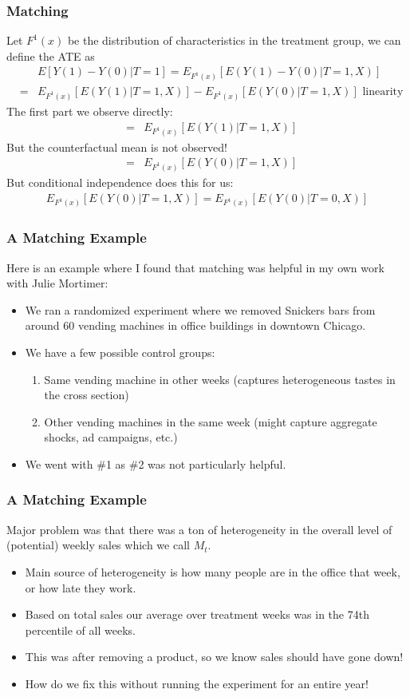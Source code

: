 \begin{frame}
\frametitle{Matching}
Let  $F^{1}(x)$ be the distribution of characteristics in the treatment group, we can define the ATE as 
\begin{eqnarray*}
&&E[Y(1) - Y(0) | T =1] = E_{F^1(x)} [E(Y(1) -Y(0) | T=1,X)] \\
&=&  E_{F^1(x)} [E(Y(1) | T=1,X)] -  E_{F^1(x)} [E(Y(0) | T=1,X)] \mbox{ linearity } 
\end{eqnarray*}
The first part we observe directly:
\begin{eqnarray*}
&=&  E_{F^1(x)} [E(Y(1) | T=1,X)] 
\end{eqnarray*}
But the counterfactual mean is not observed!
\begin{eqnarray*}
&=&  E_{F^1(x)} [E(Y(0) | T=1,X)] 
\end{eqnarray*}
But conditional independence does this for us:
\begin{eqnarray*}
 E_{F^1(x)} [E(Y(0) | T=1,X)]  =  E_{F^1(x)} [E(Y(0) | T=0,X)] 
\end{eqnarray*}
\end{frame}

\begin{frame}
\frametitle{A Matching Example}
Here is an example where I found that matching was helpful in my own work with Julie Mortimer:
\begin{itemize}
\item We ran a randomized experiment where we removed Snickers bars from around 60 vending machines in office buildings in downtown Chicago.
\item We have a few possible control groups:
\begin{enumerate}
\item Same vending machine in other weeks (captures heterogeneous tastes in the cross section)
\item Other vending machines in the same week (might capture aggregate shocks, ad campaigns, etc.)
\end{enumerate}
\item We went with \#1 as \#2 was not particularly helpful.
\end{itemize}
\end{frame}

\begin{frame}
\frametitle{A Matching Example}
Major problem was that there was a ton of heterogeneity in the overall level of (potential) weekly sales which we call $M_t$.
\begin{itemize}
\item Main source of heterogeneity is how many people are in the office that week, or how late they work.
\item Based on total sales our average over treatment weeks was in the 74th percentile of all weeks.
\item This was after removing a product, so we know sales should have gone down!
\item How do we fix this without running the experiment for an entire year!
\end{itemize}
\end{frame}

